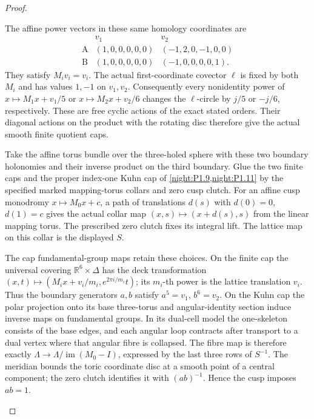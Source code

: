 \begin{proof}
\begin{enumerate}[label=\arabic*.]
The affine power vectors in these same homology coordinates are
\[
\begin{array}{c|cc}
 &v_1&v_2\\\hline
 \mathrm A&(1,0,0,0,0,0)&(-1,2,0,-1,0,0)\\
 \mathrm B&(1,0,0,0,0,0)&(-1,0,0,0,0,1).
\end{array}
\]
They satisfy $M_iv_i=v_i$. The actual first-coordinate covector
$\ell$ is fixed by both $M_i$ and has values $1,-1$ on $v_1,v_2$.
Consequently every nonidentity power of
$x\mapsto M_1x+v_1/5$ or $x\mapsto M_2x+v_2/6$ changes the
$\ell$-circle by $j/5$ or $-j/6$, respectively. These are free
cyclic actions of the exact stated orders. Their diagonal actions
on the product with the rotating disc therefore give the actual
smooth finite quotient caps.

Take the affine torus bundle over the three-holed sphere with these
two boundary holonomies and their inverse product on the third
boundary. Glue the two finite caps and the proper index-one Kuhn
cap of \cref{night:P1.9,night:P1.11} by the
specified marked mapping-torus collars and zero cusp clutch.
For an affine cusp monodromy $x\mapsto M_0x+c$, a path of translations
$d(s)$ with $d(0)=0$, $d(1)=c$ gives the actual collar map
$(x,s)\mapsto(x+d(s),s)$ from the linear mapping torus. The prescribed
zero clutch fixes its integral lift. The lattice map on this collar
is the displayed $S$.

The cap fundamental-group maps retain these choices. On the finite
cap the universal covering $\mathbb R^6\times\Delta$ has the deck
transformation
$(x,t)\mapsto(M_ix+v_i/m_i,e^{2\pi i/m_i}t)$; its $m_i$-th power
is the lattice translation $v_i$. Thus the boundary generators
$a,b$ satisfy $a^5=v_1$, $b^6=v_2$. On the Kuhn cap the polar
projection onto its base three-torus and angular-identity section
induce inverse maps on fundamental groups. In its dual-cell model
the one-skeleton consists of the base edges, and each angular loop
contracts after transport to a dual vertex where that angular
fibre is collapsed. The fibre map is therefore exactly
$\Lambda\to\Lambda/\operatorname{im}(M_0-I)$, expressed by the last
three rows of $S^{-1}$. The meridian bounds the toric coordinate
disc at a smooth point of a central component; the zero clutch
identifies it with $(ab)^{-1}$. Hence the cusp imposes $ab=1$.


\end{enumerate}
\end{proof}
